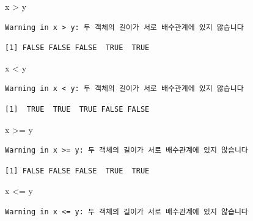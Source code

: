 \documentclass[
  11pt,
]{krantz}
\newenvironment{Shaded}{\begin{snugshade}}{\end{snugshade}}
\newcommand{\NormalTok}[1]{#1}
\newcommand{\SpecialCharTok}[1]{\textcolor[rgb]{0,0,0}{#1}}
\begin{document}
\begin{Shaded}
\begin{Highlighting}[]
\NormalTok{x }\SpecialCharTok{\textgreater{}}\NormalTok{ y}
\end{Highlighting}
\end{Shaded}

\begin{verbatim}
Warning in x > y: 두 객체의 길이가 서로 배수관계에 있지 않습니다
\end{verbatim}

\begin{verbatim}
[1] FALSE FALSE FALSE  TRUE  TRUE
\end{verbatim}

\begin{Shaded}
\begin{Highlighting}[]
\NormalTok{x }\SpecialCharTok{\textless{}}\NormalTok{ y}
\end{Highlighting}
\end{Shaded}

\begin{verbatim}
Warning in x < y: 두 객체의 길이가 서로 배수관계에 있지 않습니다
\end{verbatim}

\begin{verbatim}
[1]  TRUE  TRUE  TRUE FALSE FALSE
\end{verbatim}

\begin{Shaded}
\begin{Highlighting}[]
\NormalTok{x }\SpecialCharTok{\textgreater{}=}\NormalTok{ y}
\end{Highlighting}
\end{Shaded}

\begin{verbatim}
Warning in x >= y: 두 객체의 길이가 서로 배수관계에 있지 않습니다
\end{verbatim}

\begin{verbatim}
[1] FALSE FALSE FALSE  TRUE  TRUE
\end{verbatim}

\begin{Shaded}
\begin{Highlighting}[]
\NormalTok{x }\SpecialCharTok{\textless{}=}\NormalTok{ y}
\end{Highlighting}
\end{Shaded}

\begin{verbatim}
Warning in x <= y: 두 객체의 길이가 서로 배수관계에 있지 않습니다
\end{verbatim}
\end{document}
